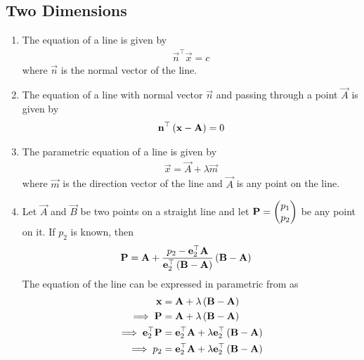 \documentclass[journal,12pt,onecolumn]{IEEEtran}
\renewcommand\thesection{\arabic{section}}
\renewcommand\thesubsection{\thesection.\arabic{subsection}}
\begin{document}
\subsection{Two Dimensions}
\renewcommand{\theequation}{\theenumi}
\begin{enumerate}[label=\thesubsection.\arabic*.,ref=\thesubsection.\theenumi]
\item The equation of a line  is given by  
\begin{align}
	\label{eq:normal_line}
   \vec{n}^{\top}\vec{x} = c
\end{align}
		where $\vec{n}$ is the normal vector of the line.
	\item The equation of a line with normal vector $\vec{n}$ and passing through a point $\vec{A}$ 
		is given by 
\begin{align}
    \label{eq:line_norm_eq}
	\mathbf{n}^{\top}\left(\mathbf{x}-\mathbf{A}\right) =0 
\end{align}
\item The parametric equation of a line  is given by  
\begin{align}
	\label{eq:dir_line}
	\vec{x} = \vec{A} + \lambda \vec{m}
\end{align}
		where $\vec{m}$ is the direction vector of the line and $\vec{A}$ is any point on the line.
  \item Let $\vec{A}$ and $\vec{B}$ be two points on a straight line and let $\mathbf{P}= \begin{pmatrix}p_1\\p_2\end{pmatrix}$ be any point on it. If $p_2$ is known, then 
  \begin{align}
	  \mathbf{P}  &=	  \mathbf{A} + \frac{p_2 -\mathbf{e}_2^{\top}  \mathbf{A} }{\mathbf{e}_2^{\top}\left(\mathbf{B} -\mathbf{A} \right)}\left(\mathbf{B} -\mathbf{A} \right)
	  \label{eq:line-3pt}
  \end{align}
  \solution The equation of the line can be expressed in parametric from as 
  \begin{align}
	  \vec{x}  &=	  \vec{A} + \lambda \brak{\vec{B} -\vec{A} }
	  \\
	  \implies 
	  \vec{P}  &=	  \vec{A} + \lambda \brak{\vec{B} -\vec{A} }
	  \\
	  \implies 	   \vec{e}_2^{\top}\vec{P}  &=	\vec{e}_2^{\top}  \vec{A} + \lambda \vec{e}_2^{\top}\brak{\vec{B} -\vec{A} }
	  \\
	 \implies p_2 &=\vec{e}_2^{\top}  \vec{A} + \lambda \vec{e}_2^{\top}\brak{\vec{B} -\vec{A} }
	 \\

\end{align}
\end{enumerate}
\end{document}
